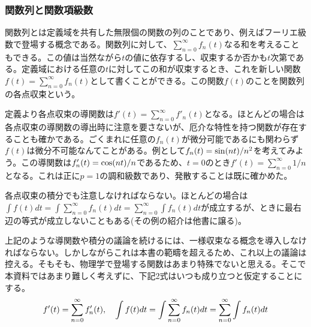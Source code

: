 \documentclass[dvipdfmx, 9pt, a4paper]{jsarticle}
\begin{document}
\subsubsection{関数列と関数項級数}
関数列とは定義域を共有した無限個の関数の列のことであり、例えばフーリエ級数で登場する概念である。関数列に対して、$\sum_{n=0}^\infty f_n(t)$なる和を考えることもできる。この値は当然ながら$t$の値に依存するし、収束するか否かも$t$次第である。定義域における任意の$t$に対してこの和が収束するとき、これを新しい関数$f(t)=\sum_{n=0}^\infty f_n(t)$として書くことができる。この関数$f(t)$のことを関数列の各点収束という。\par
定義より各点収束の導関数は$f'(t)=\sum_{n=0}^\infty f'_n(t)$となる。ほとんどの場合は各点収束の導関数の導出時に注意を要さないが、厄介な特性を持つ関数が存在することも確かである。ごくまれに任意の$f_n(t)$が微分可能であるにも関わらず$f(t)$は微分不可能なんてことがある。例として$f_n(t)={\rm sin}(nt)/n^2$を考えてみよう。この導関数は$f'_n(t)={\rm cos}(nt)/n$であるため、$t=0$のとき$f'(t)=\sum_{n=0}^\infty 1/n$となる。これは正に$p=1$の調和級数であり、発散することは既に確かめた。\par
各点収束の積分でも注意しなければならない。ほとんどの場合は$\int f(t)dt=\int \sum_{n=0}^\infty f_n(t)dt=\sum_{n=0}^\infty \int f_n(t)dt$が成立するが、ときに最右辺の等式が成立しないこともある(その例の紹介は他書に譲る)。\par
上記のような導関数や積分の議論を続けるには、一様収束なる概念を導入しなければならない。しかしながらこれは本書の範疇を超えるため、これ以上の議論は控える。そもそも、物理学で登場する関数はあまり特殊でないと思える。そこで本資料ではあまり難しく考えずに、下記2式はいつも成り立つと仮定することにする。
\begin{equation}
f'(t)=\sum_{n=0}^\infty f'_n(t),~~~\int f(t)dt=\int \sum_{n=0}^\infty f_n(t)dt=\sum_{n=0}^\infty \int f_n(t)dt \notag
\end{equation}
\end{document}
